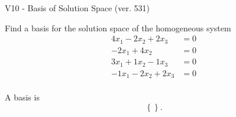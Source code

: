 \begin{exercise}
  \begin{exerciseTitle}V10 - Basis of Solution Space (ver. 531)\end{exerciseTitle}
  \begin{exerciseStatement}
    Find a basis for the solution space of the homogeneous system 
\begin{align*}
 4 x_ 1 -2 x_ 2 + 2 x_ 3 &= 0  \\ 
  -2 x_ 1 + 4 x_ 2 &= 0  \\ 
  3 x_ 1 + 1 x_ 2 -1 x_ 3 &= 0  \\ 
  -1 x_ 1 -2 x_ 2 + 2 x_ 3 &= 0  \\ 
 \end{align*}


 
  \end{exerciseStatement}

  \begin{exerciseAnswer}
   A basis is   
\[\left\{\right\}.\]

  


  \end{exerciseAnswer}
\end{exercise}